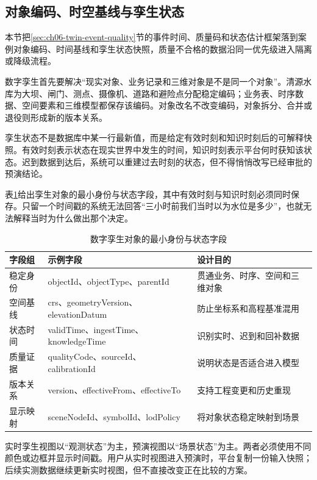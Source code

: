 \subsection{对象编码、时空基线与孪生状态}\label{sec:ch08-twin-event-quality}

本节把\ref{sec:ch06-twin-event-quality}节的事件时间、质量码和状态估计框架落到案例对象编码、时间基线和孪生状态快照，质量不合格的数据沿同一优先级进入隔离或降级流程。

数字孪生首先要解决“现实对象、业务记录和三维对象是不是同一个对象”。清源水库为大坝、闸门、测点、摄像机、道路和避险点分配稳定编码；业务表、时序数据、空间要素和三维模型都保存该编码。对象改名不改变编码，对象拆分、合并或退役则形成新的版本关系。

孪生状态不是数据库中某一行最新值，而是给定有效时刻和知识时刻后的可解释快照。有效时刻表示状态在现实世界中发生的时间，知识时刻表示平台何时获知该状态。迟到数据到达后，系统可以重建过去时刻的状态，但不得悄悄改写已经审批的预演结论。

表\ref{tab:twin-object-state}给出孪生对象的最小身份与状态字段，其中有效时刻与知识时刻必须同时保存。只留一个时间戳的系统无法回答“三小时前我们当时以为水位是多少”，也就无法解释当时为什么做出那个决定。

\begin{table}[htbp]
\centering
\caption{数字孪生对象的最小身份与状态字段}
\label{tab:twin-object-state}
\begin{tabular}{p{2.4cm}p{4.6cm}p{5.6cm}}
\toprule
字段组 & 示例字段 & 设计目的 \\
\midrule
稳定身份 & objectId、objectType、parentId & 贯通业务、时序、空间和三维对象 \\
空间基线 & crs、geometryVersion、elevationDatum & 防止坐标系和高程基准混用 \\
状态时间 & validTime、ingestTime、knowledgeTime & 识别实时、迟到和回补数据 \\
质量证据 & qualityCode、sourceId、calibrationId & 说明状态是否适合进入模型 \\
版本关系 & version、effectiveFrom、effectiveTo & 支持工程变更和历史重现 \\
显示映射 & sceneNodeId、symbolId、lodPolicy & 将对象状态稳定映射到场景 \\
\bottomrule
\end{tabular}
\end{table}

实时孪生视图以“观测状态”为主，预演视图以“场景状态”为主。两者必须使用不同颜色或边框并显示时间戳。用户从实时视图进入预演时，平台复制一份输入快照；后续实测数据继续更新实时视图，但不直接改变正在比较的方案。

